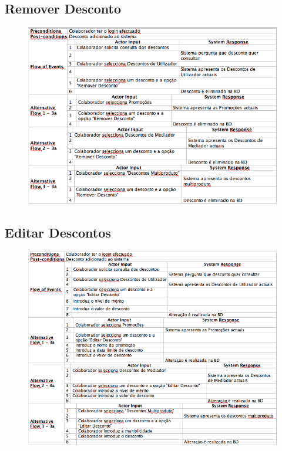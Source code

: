 \pagebreak

\subsection{Remover Desconto}
\begin{figure}[!htb]
	\centering
	\includegraphics[scale=0.50]{images/Prints/ConfiguracaoDescontos/RemoverDesconto.png}
\end{figure}

\pagebreak

\subsection{Editar Descontos}
\begin{figure}[!htb]
	\centering
	\includegraphics[scale=0.60]{images/Prints/ConfiguracaoDescontos/EditarDesconto.png}
\end{figure}

